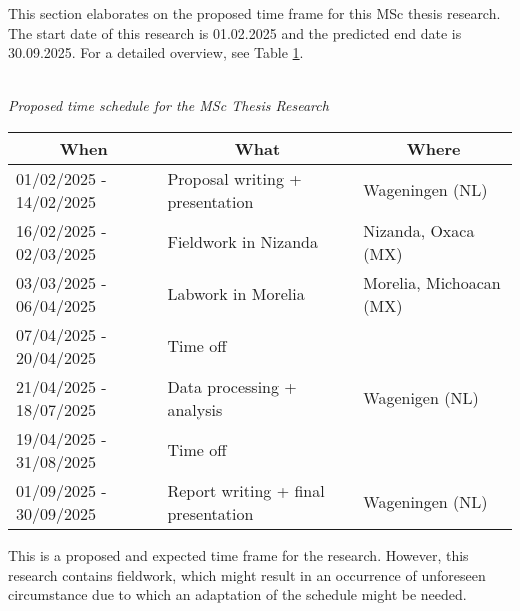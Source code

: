 

This section elaborates on the proposed time frame for this MSc thesis research. The start date of this research is 01.02.2025 and the predicted end date is 30.09.2025. For a detailed overview, see Table \ref{tab:timeschedule}.

\begin{table}[h]
\\{\textit{Proposed time schedule for the MSc Thesis Research}}\\

\begin{tabular}{lll}\hline
\multicolumn{1}{c}{\textbf{When}} & \multicolumn{1}{c}{\textbf{What}}   & \multicolumn{1}{c}{\textbf{Where}} \\\hline
01/02/2025 - 14/02/2025           & Proposal writing + presentation     & Wageningen (NL)                    \\
16/02/2025 - 02/03/2025           & Fieldwork in Nizanda                & Nizanda, Oxaca (MX)                \\
03/03/2025 - 06/04/2025           & Labwork in Morelia                  & Morelia, Michoacan (MX)            \\
07/04/2025 - 20/04/2025           & Time off                 &           \\
21/04/2025 - 18/07/2025           & Data processing + analysis          & Wagenigen (NL)                     \\
19/04/2025 - 31/08/2025           & Time off                 &           \\

01/09/2025 - 30/09/2025           & Report writing + final presentation & Wageningen (NL)\\\hline                 
\end{tabular}\label{tab:timeschedule}
\end{table}

This is a proposed and expected time frame for the research. However, this research contains fieldwork, which might result in an occurrence of unforeseen circumstance due to which an adaptation of the schedule might be needed. 